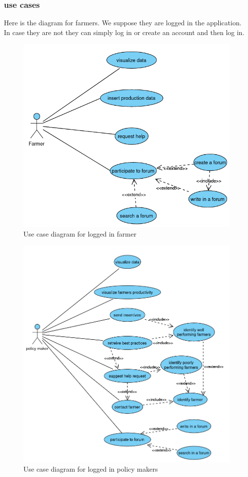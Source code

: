 \subsubsection{use cases}
Here is the diagram for farmers. We suppose they are logged in the application. In case they are not they can simply log in or create an account and then log in.
\begin{figure}
	\centering
	\includegraphics[width=\textwidth]{Images/use-case-farmer.png}
	\caption{\label{fig:usecasefarmer}Use case diagram for logged in farmer}
\end{figure}

\begin{figure}
	\centering
	\includegraphics[width=\textwidth]{Images/use-case-policy.png}
	\caption{\label{fig:usecasepolicymakers}Use case diagram for logged in policy makers}
\end{figure}
